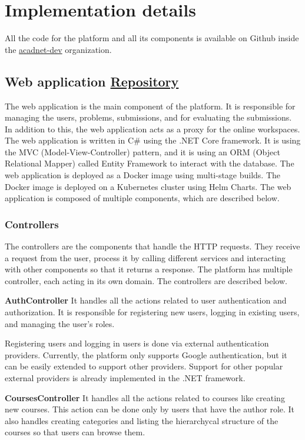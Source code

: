 \documentclass[12pt,a4paper]{report}
\begin{document}
\chapter{Implementation details}
\label{implementation-details}
All the code for the platform and all its components is available on Github inside the \href{https://github.com/acadnet-dev}{acadnet-dev} organization.

\section{Web application \href{https://github.com/acadnet-dev/web}{ Repository}}
The web application is the main component of the platform. It is responsible for managing the users, problems, submissions, and for evaluating the submissions. In addition to this, the web application acts as a proxy for the online workspaces. The web application is written in C\# using the .NET Core framework. It is using the MVC (Model-View-Controller) pattern, and it is using an ORM (Object Relational Mapper) called Entity Framework to interact with the database. The web application is deployed as a Docker image using multi-stage builds. The Docker image is deployed on a Kubernetes cluster using Helm Charts. The web application is composed of multiple components, which are described below.

\subsection{Controllers}
The controllers are the components that handle the HTTP requests. They receive a request from the user, process it by calling different services and interacting with other components so that it returns a response. The platform has multiple controller, each acting in its own domain. The controllers are described below.

\textbf{AuthController}
It handles all the actions related to user authentication and authorization. It is responsible for registering new users, logging in existing users, and managing the user's roles.

Registering users and logging in users is done via external authentication providers. Currently, the platform only supports Google authentication, but it can be easily extended to support other providers. Support for other popular external providers is already implemented in the .NET framework.

\textbf{CoursesController}
It handles all the actions related to courses like creating new courses. This action can be done only by users that have the author role. It also handles creating categories and listing the hierarchycal structure of the courses so that users can browse them.
\end{document}
